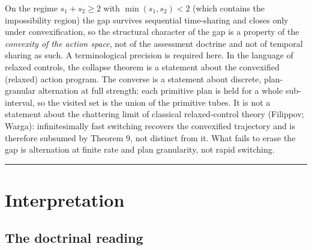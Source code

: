 \documentclass[3p,11pt]{elsarticle}
\begin{document}
On the regime \(s_1 + s_2 \ge 2\) with
\(\min(s_1, s_2) < 2\) (which contains the impossibility region) the gap survives sequential time-sharing and closes only under convexification, so the structural character of the gap is a property of
the \emph{convexity of the action space}, not of the assessment doctrine
and not of temporal sharing as such. A terminological precision is
required here. In the language of relaxed controls, the collapse theorem
is a statement about the convexified (relaxed) action program. The
converse is a statement about discrete, plan-granular alternation at
full strength: each primitive plan is held for a whole sub-interval, so
the visited set is the union of the primitive tubes. It is not a
statement about the chattering limit of classical relaxed-control
theory (Filippov; Warga): infinitesimally fast switching recovers the
convexified trajectory and is therefore subsumed by Theorem 9, not
distinct from it. What fails to erase the gap is alternation at finite
rate and plan granularity, not rapid switching.

\begin{center}\rule{0.5\linewidth}{0.5pt}\end{center}

\section{Interpretation}\label{interpretation}

\subsection{The doctrinal reading}\label{the-doctrinal-reading}
\end{document}
